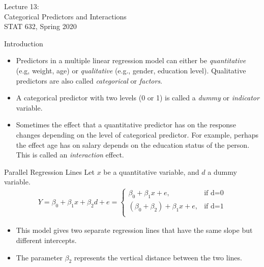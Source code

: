 \documentclass[10pt]{beamer}\usepackage[]{graphicx}\usepackage[]{color}
\begin{document}
\begin{frame}
\large
Lecture 13:\\ 
Categorical Predictors and Interactions\\
STAT 632, Spring 2020\\
\end{frame}

\begin{frame}{Introduction}
\begin{itemize}
\item Predictors in a multiple linear regression model can either be \emph{quantitative} (e.g, weight, age) or \emph{qualitative} (e.g., gender, education level).  Qualitative predictors are also called \emph{categorical} or \emph{factors}.
\vspace{5pt}
\item A categorical predictor with two levels (0 or 1) is called a \emph{dummy} or \emph{indicator} variable.
\vspace{5pt}
\item Sometimes the effect that a quantitative predictor has on the response changes depending on the level of categorical predictor.  For example, perhaps the effect age has on salary depends on the education status of the person.  This is called an \emph{interaction} effect.
\end{itemize}
\end{frame}

\begin{frame}{Parallel Regression Lines}
Let $x$ be a quantitative variable, and $d$ a dummy variable.\\

\begin{align*}
Y = \beta_0 + \beta_1 x + \beta_2 d + e = 
\begin{cases}
\beta_0 + \beta_1 x + e, & \text{if d=0}\\
(\beta_0 + \beta_2) + \beta_1 x + e, & \text{if d=1}\\
\end{cases}
\end{align*}

\begin{itemize}
\item This model gives two separate regression lines that have the same slope but different intercepts.
\item The parameter $\beta_2$ represents the vertical distance between the two lines.
\end{itemize}
\end{frame}
\end{document}
